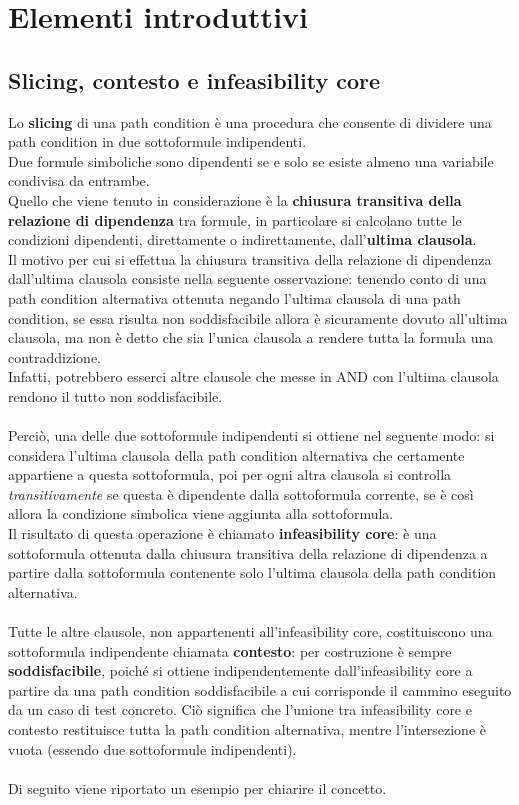 \documentclass[a4paper, 12pt, oneside]{book}
\theoremstyle{normal}
\begin{document}
\section{Elementi introduttivi}

\subsection{Slicing, contesto e infeasibility core}

Lo \textbf{slicing} di una path condition è una procedura che consente di dividere una path condition in due sottoformule indipendenti. \\ Due formule simboliche sono dipendenti se e solo se esiste almeno una variabile condivisa da entrambe. \\ Quello che viene tenuto in considerazione è la \textbf{chiusura transitiva della relazione di dipendenza} tra formule, in particolare si calcolano tutte le condizioni dipendenti, direttamente o indirettamente, dall'\textbf{ultima clausola}. \\ Il motivo per cui si effettua la chiusura transitiva della relazione di dipendenza dall'ultima clausola consiste nella seguente osservazione: tenendo conto di una path condition alternativa ottenuta negando l'ultima clausola di una path condition, se essa risulta non soddisfacibile allora è sicuramente dovuto all'ultima clausola, ma non è detto che sia l'unica clausola a rendere tutta la formula una contraddizione. \\ Infatti, potrebbero esserci altre clausole che messe in AND con l'ultima clausola rendono il tutto non soddisfacibile. \\ \\ Perciò, una delle due sottoformule indipendenti si ottiene nel seguente modo: si considera l'ultima clausola della path condition alternativa che certamente appartiene a questa sottoformula, poi per ogni altra clausola si controlla \emph{transitivamente} se questa è dipendente dalla sottoformula corrente, se è così allora la condizione simbolica viene aggiunta alla sottoformula. \\ Il risultato di questa operazione è chiamato \textbf{infeasibility core}: è una sottoformula ottenuta dalla chiusura transitiva della relazione di dipendenza a partire dalla sottoformula contenente solo l'ultima clausola della path condition alternativa. \\ \\ Tutte le altre clausole, non appartenenti all'infeasibility core, costituiscono una sottoformula indipendente chiamata \textbf{contesto}: per costruzione è sempre \textbf{soddisfacibile}, poiché si ottiene indipendentemente dall'infeasibility core a partire da una path condition soddisfacibile a cui corrisponde il cammino eseguito da un caso di test concreto. Ciò significa che l'unione tra infeasibility core e contesto restituisce tutta la path condition alternativa, mentre l'intersezione è vuota (essendo due sottoformule indipendenti). \\ \\ Di seguito viene riportato un esempio per chiarire il concetto. \\
\end{document}
